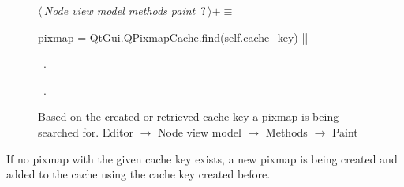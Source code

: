 \documentclass[%
    a4paper,    %
    justified,  %
    nobib,      %
    openany     %
]{tufte-book}
\makeatletter
\renewcommand{\label}[1]{\@tufte@label{##1}}%
\makeatother
\begin{document}
\begin{figure}
\begin{flushleft} \small
\begin{minipage}{\linewidth}\label{scrap79}\raggedright\small
{} $\langle\,${\itshape Node view model methods paint}\nobreak\ {\footnotesize {?}}$\,\rangle+\equiv$
\vspace{-1ex}
\begin{pythoncode}
pixmap = QtGui.QPixmapCache.find(self.cache_key)
|\NWsep|
\end{pythoncode}
\vspace{1.5ex}
\footnotesize
\begin{list}{}{\setlength{\itemsep}{-\parsep}\setlength{\itemindent}{-\leftmargin}}
\item \NWtxtMacroDefBy\ .
\item \NWtxtMacroRefIn\ .

\item{}
\end{list}
\end{minipage}\vspace{4ex}
\end{flushleft}
\caption{Based on the created or retrieved cache key a pixmap is being searched
  for.
  \newline{}\newline{}Editor $\rightarrow$ Node view model $\rightarrow$
  Methods $\rightarrow$ Paint}
\label{editor:lst:node-view-model:methods:paint:find-pixmap}
\end{figure}

If no pixmap with the given cache key exists, a new pixmap is being created and
added to the cache using the cache key created before.
\end{document}
